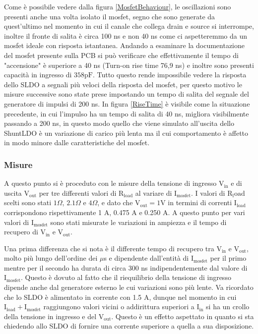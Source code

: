 Come è possibile vedere dalla figura \ref{MosfetBehaviour}, le oscillazioni sono presenti anche una volta isolato il mosfet, segno che sono generate da quest'ultimo nel momento in cui il canale che collega drain e source si interrompe, inoltre il fronte di salita è circa 100 ns e non 40 ns come ci aspetteremmo da un mosfet ideale con risposta istantanea. Andando a esaminare la documentazione del mosfet presente sulla PCB 
si può verificare che effettivamente il tempo di "accensione" è superiore a 40 ns (Turn-on rise time 76,9 ns) e inoltre sono presenti capacità in ingresso di $\mathrm{358 pF}$. Tutto questo rende impossibile vedere la risposta dello SLDO a segnali più veloci della risposta del mosfet, per questo motivo le misure successive sono state prese impostando un tempo di salita del segnale del generatore di impulsi di 200 ns.
In figura \ref{RiseTime} è visibile come la situazione precedente, in cui l'impulso ha un tempo di salita di 40 ns, migliora visibilmente passando a 200 ns, in questo modo quello che viene simulato all'uscita dello ShuntLDO è un variazione di carico più lenta ma il cui comportamento è affetto in modo minore dalle caratteristiche del mosfet. 

\subsubsection{Misure}
A questo punto si è proceduto con le misure della tensione di ingresso $\mathrm{V_{in}}$ e di uscita $\mathrm{V_{out}}$ per tre differenti valori di $\mathrm{R_{load}}$ al variare di $\mathrm{I_{mosfet}}$. I valori di $\mathrm{R_load}$ scelti sono stati $1 \Omega$, $2.1 \Omega$ e $4 \Omega$, e dato che $\mathrm{V_{out}=1V}$ in termini di correnti  $\mathrm{I_{load}}$ corrispondono rispettivamente 1 A, 0.475 A e 0.250 A. A questo punto per vari valori di $\mathrm{I_{mosfet}}$ sono stati misurate le variazioni in ampiezza e il tempo di recupero di $\mathrm{V_{in}}$ e $\mathrm{V_{out}}$.

Una prima differenza che si nota è il differente tempo di recupero tra $\mathrm{V_{in}}$ e $\mathrm{V_{out}}$, molto più lungo dell'ordine dei $\mu$s e dipendente dall'entità di $\mathrm{I_{mosfet}}$ per il primo mentre per il secondo ha durata di circa 300 ns indipendentemente dal valore di $\mathrm{I_{mosfet}}$. 
Questo è dovuto al fatto che il riequilibrio della tensione di ingresso dipende anche dal generatore esterno le cui variazioni sono più lente.
Va ricordato che lo SLDO è alimentato in corrente con 1.5 A, dunque nel momento in cui $\mathrm{I_{load}+I_{mosfet}}$ raggiungono valori vicini o addirittura superiori  a $\mathrm{I_{in}}$ si ha un crollo della tensione in ingresso e del $\mathrm{V_{out}}$. Questo è un effetto aspettato in quanto si sta chiedendo allo SLDO di fornire una corrente superiore a quella a sua disposizione.


